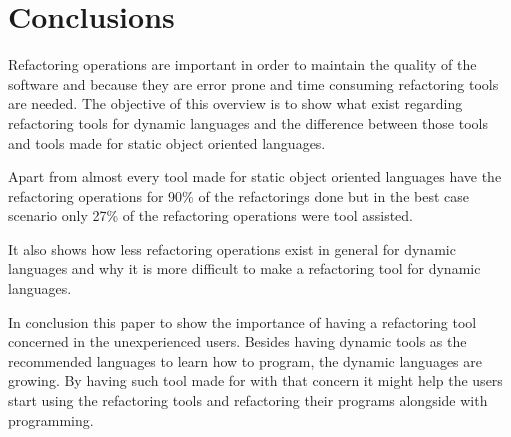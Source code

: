 
% 
% 

\section{Conclusions}



Refactoring operations are important in order to maintain the quality of the software and because they are error prone and time consuming refactoring tools are needed.
The objective of this overview is to show what exist regarding refactoring tools for dynamic languages and the difference between those tools and tools made for static object oriented languages.

Apart from almost  every tool made for static object oriented languages have the refactoring operations for 90\% of the refactorings done but in the best case scenario only 27\% of the refactoring operations were tool assisted.

It also shows how less refactoring operations exist in general for dynamic languages and why it is more difficult to make a refactoring tool for dynamic languages.

In conclusion this paper to show the importance of having a refactoring tool concerned in the unexperienced users. Besides having dynamic tools as the recommended languages to learn how to program, the dynamic languages are growing. By having such tool made for with that concern it might help the users start using the refactoring tools and refactoring their programs alongside with programming.

